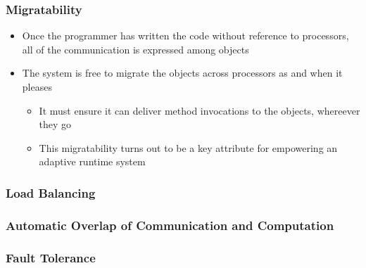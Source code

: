 
\begin{frame}[t]
\frametitle{Migratability}
  \begin{itemize}
    \item Once the programmer has written the code without reference to
        processors, all of the communication is expressed among objects
    \item The system is free to migrate the objects across processors as and when it pleases
      \begin{itemize}
        \item It must ensure it can deliver method invocations to the objects, whereever they go
        \item This migratability turns out to be a key attribute for empowering an adaptive runtime system
      \end{itemize}
  \end{itemize}
\end{frame}

\begin{frame}[t]
  \frametitle{Load Balancing}
\end{frame}

\begin{frame}[t]
  \frametitle{Automatic Overlap of Communication and Computation}
\end{frame}

\begin{frame}[t]
  \frametitle{Fault Tolerance}
\end{frame}

